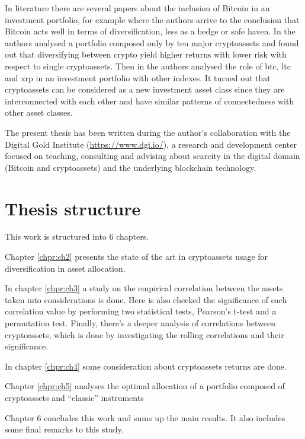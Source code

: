 \bigskip
In literature there are several papers about the inclusion of Bitcoin in an investment portfolio, for example \citep{bouri} where the authors arrive to the conclusion that Bitcoin acts well in terms of diversification, less as a hedge or safe haven.
In \citep{weiyi} the authors analysed a portfolio composed only by ten major cryptoassets and found out that diversifying between crypto yield higher returns with lower risk with respect to single cryptoassets. 
Then in \citep{corbet} the authors analysed the role of btc, ltc and xrp in an investment portfolio with other indexes. It turned out that cryptoassets can be considered as a new investment asset class since they are interconnected with each other and have similar patterns of connectedness with other asset classes.



\bigskip
\noindent
The present thesis has been written during the author's collaboration with the Digital Gold Institute (\href{https://www.dgi.io/}{https://www.dgi.io/}), a research and development center focused on teaching, consulting and advising about scarcity in the digital domain (Bitcoin and cryptoassets) and the underlying blockchain technology.


\section{Thesis structure}
\bigskip
This work is structured into 6 chapters.

\noindent
Chapter \ref{chpr:ch2} presents the state of the art in cryptoassets usage for diversification in asset allocation.

\noindent
In chapter \ref{chpr:ch3} a study on the empirical correlation between the assets taken into considerations is done. Here is also checked the significance of each correlation value by performing two statistical tests, Pearson's t-test and a permutation test. Finally, there's a deeper analysis of correlations between cryptoassets, which is done by investigating the rolling correlations and their significance.

\noindent
In chapter \ref{chpr:ch4} some consideration about cryptoassets returns are done.

\noindent
Chapter \ref{chpr:ch5} analyses the optimal allocation of a portfolio composed of cryptoassets and “classic” instruments

\noindent
Chapter 6 concludes this work and sums up the main results. It also includes some final remarks to this study.



